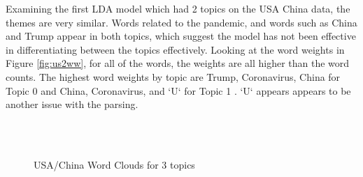 Examining the first LDA model which had 2 topics on the USA China data, the themes are very similar. Words related to the pandemic, and words such as China and Trump appear in both topics, which suggest the model has not been effective in differentiating between the topics effectively. Looking at the word weights in Figure \ref{fig:us2ww}, for all of the words, the weights are all higher than the word counts. The highest word weights by topic are Trump, Coronavirus, China for Topic 0 and China, Coronavirus, and `U` for Topic 1 . `U` appears appears to be another issue with the parsing.  
\begin{figure}[H]
	\centering
	\\
	\\
	
	\caption{USA/China Word Clouds for 3 topics}
	\label{fig:usa3}
\end{figure}

